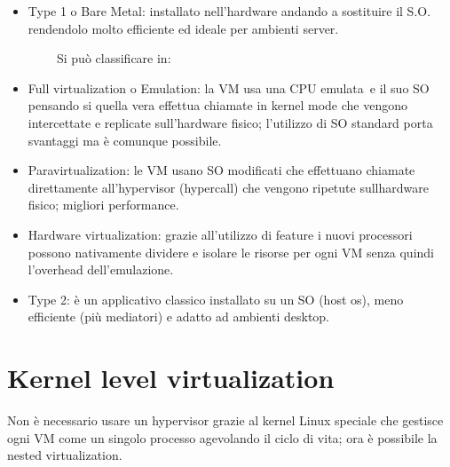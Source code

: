 \documentclass[
]{article}
\providecommand{\tightlist}{%
  \setlength{\itemsep}{0pt}\setlength{\parskip}{0pt}}
\begin{document}
\begin{itemize}
\tightlist
\item
  {Type 1 o Bare Metal}{: installato nell'hardware andando a sostituire
  il S.O. rendendolo molto efficiente ed ideale per ambienti server.}
\end{itemize}

{~~~~~~~~Si può classificare in:}

\begin{itemize}
\tightlist
\item
  {Full virtualization o Emulation}{: la VM usa una CPU }{emulata}{~e il
  suo SO pensando si quella vera effettua chiamate in kernel mode che
  vengono intercettate e replicate sull'hardware fisico; l'utilizzo di
  SO standard porta svantaggi ma è comunque possibile.}
\end{itemize}

{}

\begin{itemize}
\tightlist
\item
  {Paravirtualization}{: le VM usano SO modificati che effettuano
  chiamate direttamente all'hypervisor (hypercall) che vengono ripetute
  sull\textquotesingle hardware fisico; migliori performance.}
\end{itemize}

{}

\begin{itemize}
\tightlist
\item
  {Hardware virtualization}{: grazie all'utilizzo di feature i nuovi
  processori possono nativamente dividere e isolare le risorse per ogni
  VM senza quindi l'overhead dell'emulazione.}
\end{itemize}

{}

\begin{itemize}
\tightlist
\item
  {Type 2}{: è un applicativo classico installato su un SO (host os),
  meno efficiente (più mediatori) e adatto ad ambienti desktop.}
\end{itemize}

{}

\section{\texorpdfstring{{Kernel level
virtualization}}{Kernel level virtualization}}\label{h.ms7bwoopd3ky}

{Non è necessario usare un hypervisor grazie al kernel Linux speciale
che gestisce ogni VM come un singolo processo agevolando il ciclo di
vita; ora è possibile la nested virtualization.}
\end{document}
